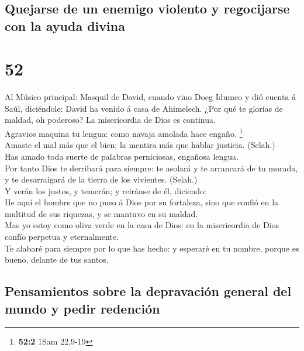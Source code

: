 \hypertarget{quejarse-de-un-enemigo-violento-y-regocijarse-con-la-ayuda-divina}{%
\subsection{Quejarse de un enemigo violento y regocijarse con la ayuda
divina}\label{quejarse-de-un-enemigo-violento-y-regocijarse-con-la-ayuda-divina}}

\hypertarget{section-51}{%
\section{52}\label{section-51}}

 Al Músico principal: Masquil de David, cuando vino Doeg
Idumeo y dió cuenta á Saúl, diciéndole: David ha venido á casa de
Ahimelech. ¿Por qué te glorías de maldad, oh poderoso? La misericordia
de Dios es continua.\\
 Agravios maquina tu lengua: como navaja amolada hace
engaño. \footnote{\textbf{52:2} 1Sam 22,9-19}\\
 Amaste el mal más que el bien; la mentira más que hablar
justicia. (Selah.)\\
 Has amado toda suerte de palabras perniciosas, engañosa
lengua.\\
 Por tanto Dios te derribará para siempre: te asolará y te
arrancará de tu morada, y te desarraigará de la tierra de los vivientes.
(Selah.)\\
 Y verán los justos, y temerán; y reiránse de él,
diciendo:\\
 He aquí el hombre que no puso á Dios por su fortaleza, sino
que confió en la multitud de sus riquezas, y se mantuvo en su maldad.\\
 Mas yo estoy como oliva verde en la casa de Dios: en la
misericordia de Dios confío perpetua y eternalmente.\\
 Te alabaré para siempre por lo que has hecho: y esperaré en
tu nombre, porque es bueno, delante de tus santos.

\hypertarget{pensamientos-sobre-la-depravaciuxf3n-general-del-mundo-y-pedir-redenciuxf3n-1}{%
\subsection{Pensamientos sobre la depravación general del mundo y pedir
redención}\label{pensamientos-sobre-la-depravaciuxf3n-general-del-mundo-y-pedir-redenciuxf3n-1}}

